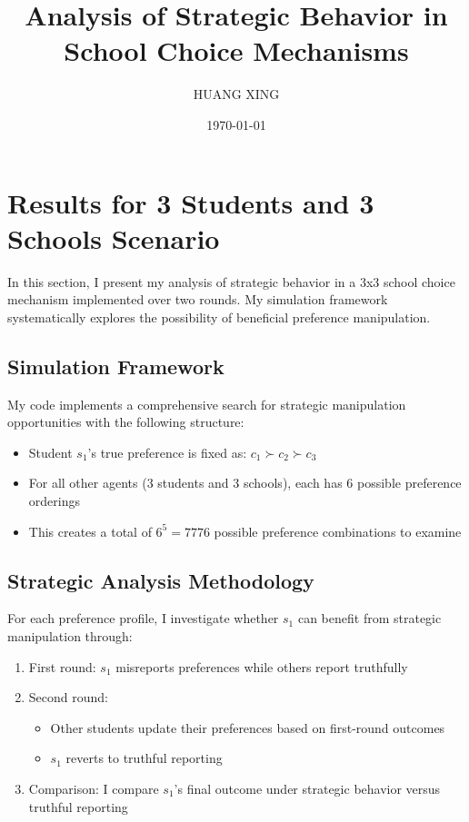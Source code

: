 \documentclass{article}
\title{Analysis of Strategic Behavior in School Choice Mechanisms}
\author{HUANG XING}
\date{\today}
\begin{document}
\maketitle

\section{Results for 3 Students and 3 Schools Scenario}

In this section, I present my analysis of strategic behavior in a 3x3 school choice mechanism implemented over two rounds. My simulation framework systematically explores the possibility of beneficial preference manipulation.

\subsection{Simulation Framework}
My code implements a comprehensive search for strategic manipulation opportunities with the following structure:
\begin{itemize}
    \item Student $s_1$'s true preference is fixed as: $c_1 \succ c_2 \succ c_3 $
    \item For all other agents (3 students and 3 schools), each has 6 possible preference orderings
    \item This creates a total of $6^5=7776$ possible preference combinations to examine
\end{itemize}

\subsection{Strategic Analysis Methodology}
For each preference profile, I investigate whether $s_1$ can benefit from strategic manipulation through:
\begin{enumerate}
    \item First round: $s_1$ misreports preferences while others report truthfully
    \item Second round: 
        \begin{itemize}
            \item Other students update their preferences based on first-round outcomes
            \item $s_1$ reverts to truthful reporting
        \end{itemize}
    \item Comparison: I compare $s_1$'s final outcome under strategic behavior versus truthful reporting
\end{enumerate}
\end{document}
